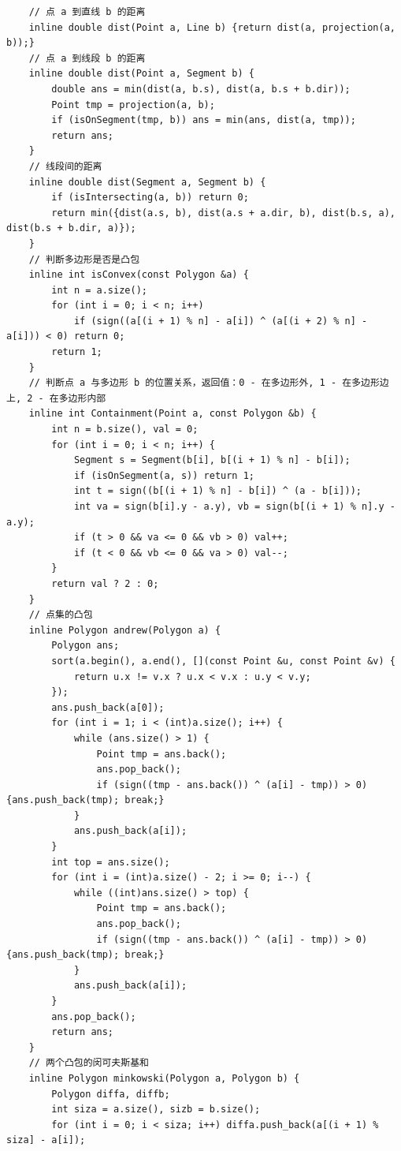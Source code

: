 \begin{verbatim}
    // 点 a 到直线 b 的距离
    inline double dist(Point a, Line b) {return dist(a, projection(a, b));}
    // 点 a 到线段 b 的距离
    inline double dist(Point a, Segment b) {
        double ans = min(dist(a, b.s), dist(a, b.s + b.dir));
        Point tmp = projection(a, b);
        if (isOnSegment(tmp, b)) ans = min(ans, dist(a, tmp));
        return ans;
    }
    // 线段间的距离
    inline double dist(Segment a, Segment b) {
        if (isIntersecting(a, b)) return 0;
        return min({dist(a.s, b), dist(a.s + a.dir, b), dist(b.s, a), dist(b.s + b.dir, a)});
    }
    // 判断多边形是否是凸包
    inline int isConvex(const Polygon &a) {
        int n = a.size();
        for (int i = 0; i < n; i++)
            if (sign((a[(i + 1) % n] - a[i]) ^ (a[(i + 2) % n] - a[i])) < 0) return 0;
        return 1;
    }
    // 判断点 a 与多边形 b 的位置关系，返回值：0 - 在多边形外, 1 - 在多边形边上, 2 - 在多边形内部
    inline int Containment(Point a, const Polygon &b) {
        int n = b.size(), val = 0;
        for (int i = 0; i < n; i++) {
            Segment s = Segment(b[i], b[(i + 1) % n] - b[i]);
            if (isOnSegment(a, s)) return 1;
            int t = sign((b[(i + 1) % n] - b[i]) ^ (a - b[i]));
            int va = sign(b[i].y - a.y), vb = sign(b[(i + 1) % n].y - a.y);
            if (t > 0 && va <= 0 && vb > 0) val++;
            if (t < 0 && vb <= 0 && va > 0) val--;
        }
        return val ? 2 : 0;
    }
    // 点集的凸包
    inline Polygon andrew(Polygon a) {
        Polygon ans;
        sort(a.begin(), a.end(), [](const Point &u, const Point &v) {
            return u.x != v.x ? u.x < v.x : u.y < v.y;
        });
        ans.push_back(a[0]);
        for (int i = 1; i < (int)a.size(); i++) {
            while (ans.size() > 1) {
                Point tmp = ans.back();
                ans.pop_back();
                if (sign((tmp - ans.back()) ^ (a[i] - tmp)) > 0) {ans.push_back(tmp); break;}
            }
            ans.push_back(a[i]);
        }
        int top = ans.size();
        for (int i = (int)a.size() - 2; i >= 0; i--) {
            while ((int)ans.size() > top) {
                Point tmp = ans.back();
                ans.pop_back();
                if (sign((tmp - ans.back()) ^ (a[i] - tmp)) > 0) {ans.push_back(tmp); break;}
            }
            ans.push_back(a[i]);
        }
        ans.pop_back();
        return ans;
    }
    // 两个凸包的闵可夫斯基和
    inline Polygon minkowski(Polygon a, Polygon b) {
        Polygon diffa, diffb;
        int siza = a.size(), sizb = b.size();
        for (int i = 0; i < siza; i++) diffa.push_back(a[(i + 1) % siza] - a[i]);

\end{verbatim}
